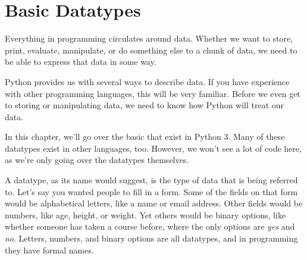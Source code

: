 \chapter{Basic Datatypes}
Everything in programming circulates around data. Whether we want to store, print, evaluate, manipulate, or do something else to a chunk of data, we need to be able to express that data in some way.\par
Python provides us with several ways to describe data. If you have experience with other programming languages, this will be very familiar. Before we even get to storing or manipulating data, we need to know how Python will treat our data.\par
In this chapter, we'll go over the basic  that exist in Python 3. Many of these datatypes exist in other languages, too. However, we won't see a lot of code here, as we're only going over the datatypes themselves.\par
A datatype, as its name would suggest, is the type of data that is being referred to. Let's say you wanted people to fill in a form. Some of the fields on that form would be alphabetical letters, like a name or email address. Other fields would be numbers, like age, height, or weight. Yet others would be binary options, like whether someone has taken a course before, where the only options are \textit{yes} and \textit{no}. Letters, numbers, and binary options are all datatypes, and in programming they have formal names.
